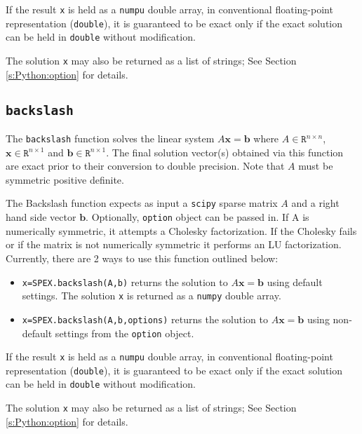 \documentclass[12pt,oneside]{book}
\theoremstyle{definition}
\renewcommand{\b}{\mathbf{b}}
\newcommand{\x}{\mathbf{x}}
\begin{document}
If the result \verb|x| is held as a \verb|numpu| double array, in conventional floating-point representation (\verb|double|), it is guaranteed to be exact only if the exact solution can be held in \verb|double| without modification.

The solution \verb|x| may also be returned as a list of strings; See Section \ref{s:Python:option} for details.


\subsection{\texttt{backslash}}
The \verb|backslash| function solves the linear system $A\x=\b$ where $A \in \mathtt{R}^{n \times n}$, $\x \in \mathtt{R}^{n \times 1}$ and $\b \in \mathtt{R}^{n \times 1}$. The final solution vector(s) obtained via this function are exact prior to their conversion to double precision. Note that $A$ must be symmetric positive definite.

The Backslash function expects as input a \verb|scipy| sparse matrix $A$ and a right hand side vector $\b$. Optionally, \verb|option| object can be passed in. If A is numerically symmetric, it attempts a Cholesky factorization. If the Cholesky fails or if the matrix is not numerically symmetric it performs an LU factorization.
Currently, there are 2 ways to use this function outlined below:

\begin{itemize}
    \item \verb|x=SPEX.backslash(A,b)| returns the solution to $A \x = \b$ using default settings. The solution \verb|x| is returned as a \verb|numpy| double array.
    \item \verb|x=SPEX.backslash(A,b,options)| returns the solution to $A \x = \b$ using non-default settings from the \verb|option| object.
\end{itemize}

If the result \verb|x| is held as a \verb|numpu| double array, in conventional floating-point representation (\verb|double|), it is guaranteed to be exact only if the exact solution can be held in \verb|double| without modification.

The solution \verb|x| may also be returned as a list of strings; See Section \ref{s:Python:option} for details.


\end{document}
